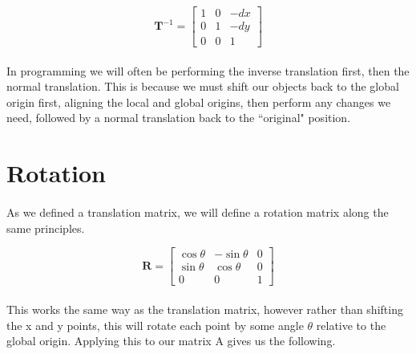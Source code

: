 \documentclass[12pt, letterpaper]{report}
\begin{document}
	\begin{equation}
	\mathbf
	T^{-1} =
	\begin{bmatrix}
	1 & 0 & -dx\\
	0 & 1 & -dy\\
	0 & 0 & 1
	\end{bmatrix}
	\end{equation}

	\paragraph{} In programming we will often be performing the inverse translation first, then the normal translation. This is because we must shift our objects back to the global origin first, aligning the local and global origins, then perform any changes we need, followed by a normal translation back to the ``original" position.

	\newpage
	\section{Rotation}
	\paragraph{} As we defined a translation matrix, we will define a rotation matrix along the same principles.
	
	\begin{equation}
	\mathbf
	R = 
	\begin{bmatrix}
	\cos{\theta} & -\sin{\theta} & 0\\
	\sin{\theta} & \cos{\theta} & 0\\
	0 & 0 & 1
	\end{bmatrix}
	\end{equation}

	\paragraph{} This works the same way as the translation matrix, however rather than shifting the x and y points, this will rotate each point by some angle $\theta$ relative to the global origin. Applying this to our matrix A gives us the following.
	
\end{document}
